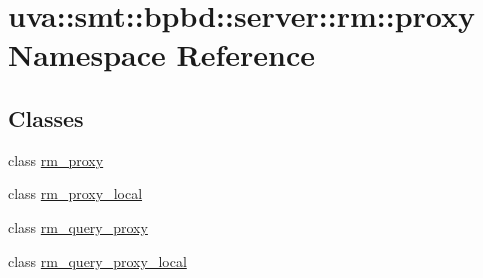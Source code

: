\hypertarget{namespaceuva_1_1smt_1_1bpbd_1_1server_1_1rm_1_1proxy}{}\section{uva\+:\+:smt\+:\+:bpbd\+:\+:server\+:\+:rm\+:\+:proxy Namespace Reference}
\label{namespaceuva_1_1smt_1_1bpbd_1_1server_1_1rm_1_1proxy}
\subsection*{Classes}
\begin{DoxyCompactItemize}
\item 
class \hyperlink{classuva_1_1smt_1_1bpbd_1_1server_1_1rm_1_1proxy_1_1rm__proxy}{rm\+\_\+proxy}
\item 
class \hyperlink{classuva_1_1smt_1_1bpbd_1_1server_1_1rm_1_1proxy_1_1rm__proxy__local}{rm\+\_\+proxy\+\_\+local}
\item 
class \hyperlink{classuva_1_1smt_1_1bpbd_1_1server_1_1rm_1_1proxy_1_1rm__query__proxy}{rm\+\_\+query\+\_\+proxy}
\item 
class \hyperlink{classuva_1_1smt_1_1bpbd_1_1server_1_1rm_1_1proxy_1_1rm__query__proxy__local}{rm\+\_\+query\+\_\+proxy\+\_\+local}
\end{DoxyCompactItemize}
